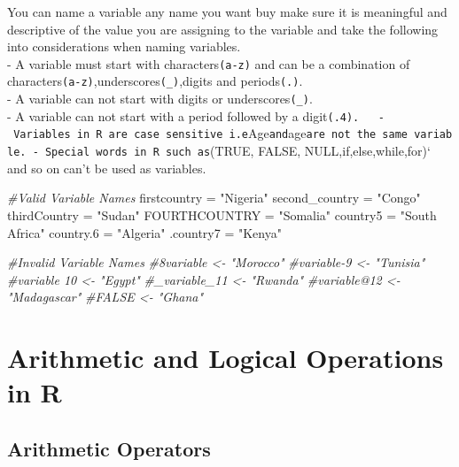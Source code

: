 \documentclass[
]{article}
\newenvironment{Shaded}{\begin{snugshade}}{\end{snugshade}}
\newcommand{\CommentTok}[1]{\textcolor[rgb]{0.56,0.35,0.01}{\textit{#1}}}
\newcommand{\FloatTok}[1]{\textcolor[rgb]{0.00,0.00,0.81}{#1}}
\newcommand{\NormalTok}[1]{#1}
\newcommand{\OtherTok}[1]{\textcolor[rgb]{0.56,0.35,0.01}{#1}}
\newcommand{\StringTok}[1]{\textcolor[rgb]{0.31,0.60,0.02}{#1}}
\begin{document}
You can name a variable any name you want buy make sure it is meaningful
and descriptive of the value you are assigning to the variable and take
the following into considerations when naming variables.\\
- A variable must start with characters\texttt{(a-z)} and can be a
combination of characters\texttt{(a-z)},underscores\texttt{(\_)},digits
and periods\texttt{(.)}.\\
- A variable can not start with digits or underscores\texttt{(\_)}.\\
- A variable can not start with a period followed by a
digit\texttt{(.4).\ \ \ -\ Variables\ in\ R\ are\ case\ sensitive\ i.e}Age\texttt{and}age\texttt{are\ not\ the\ same\ variable.\ -\ Special\ words\ in\ R\ such\ as}(TRUE,
FALSE, NULL,if,else,while,for)` and so on can't be used as variables.

\begin{Shaded}
\begin{Highlighting}[]
\CommentTok{\#Valid Variable Names}
\NormalTok{firstcountry }\OtherTok{=} \StringTok{"Nigeria"}
\NormalTok{second\_country }\OtherTok{=} \StringTok{"Congo"}
\NormalTok{thirdCountry }\OtherTok{=} \StringTok{"Sudan"}
\NormalTok{FOURTHCOUNTRY }\OtherTok{=} \StringTok{"Somalia"}
\NormalTok{country5 }\OtherTok{=} \StringTok{"South Africa"}
\NormalTok{country}\FloatTok{.6} \OtherTok{=} \StringTok{"Algeria"}
\NormalTok{.country7 }\OtherTok{=} \StringTok{"Kenya"}

\CommentTok{\#Invalid Variable Names}
\CommentTok{\#8variable \textless{}{-} "Morocco"}
\CommentTok{\#variable{-}9 \textless{}{-} "Tunisia"}
\CommentTok{\#variable 10 \textless{}{-} "Egypt"}
\CommentTok{\#\_variable\_11 \textless{}{-} "Rwanda"}
\CommentTok{\#variable@12 \textless{}{-} "Madagascar"}
\CommentTok{\#FALSE \textless{}{-} "Ghana"}
\end{Highlighting}
\end{Shaded}

\hypertarget{arithmetic-and-logical-operations-in-r}{%
\section{Arithmetic and Logical Operations in
R}\label{arithmetic-and-logical-operations-in-r}}

\hypertarget{arithmetic-operators}{%
\subsection{Arithmetic Operators}\label{arithmetic-operators}}
\end{document}
